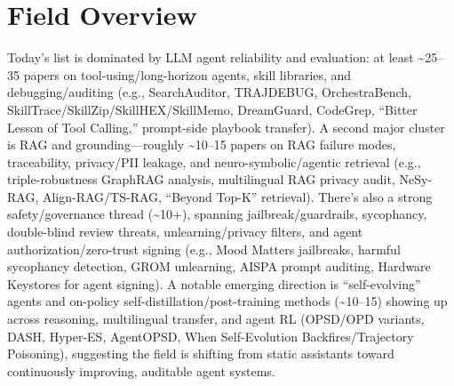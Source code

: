 \documentclass[12pt,letterpaper]{article}
\begin{document}
\section*{Field Overview}
{\footnotesize Today's list is dominated by LLM agent reliability and evaluation: at least \textasciitilde{}25--35 papers on tool-using/long-horizon agents, skill libraries, and debugging/auditing (e.g., SearchAuditor, TRAJDEBUG, OrchestraBench, SkillTrace/SkillZip/SkillHEX/SkillMemo, DreamGuard, CodeGrep, ``Bitter Lesson of Tool Calling,'' prompt-side playbook transfer). A second major cluster is RAG and grounding---roughly \textasciitilde{}10--15 papers on RAG failure modes, traceability, privacy/PII leakage, and neuro-symbolic/agentic retrieval (e.g., triple-robustness GraphRAG analysis, multilingual RAG privacy audit, NeSy-RAG, Align-RAG/TS-RAG, ``Beyond Top-K'' retrieval). There's also a strong safety/governance thread (\textasciitilde{}10+), spanning jailbreak/guardrails, sycophancy, double-blind review threats, unlearning/privacy filters, and agent authorization/zero-trust signing (e.g., Mood Matters jailbreaks, harmful sycophancy detection, GROM unlearning, AISPA prompt auditing, Hardware Keystores for agent signing). A notable emerging direction is ``self-evolving'' agents and on-policy self-distillation/post-training methods (\textasciitilde{}10--15) showing up across reasoning, multilingual transfer, and agent RL (OPSD/OPD variants, DASH, Hyper-ES, AgentOPSD, When Self-Evolution Backfires/Trajectory Poisoning), suggesting the field is shifting from static assistants toward continuously improving, auditable agent systems.}
\end{document}
